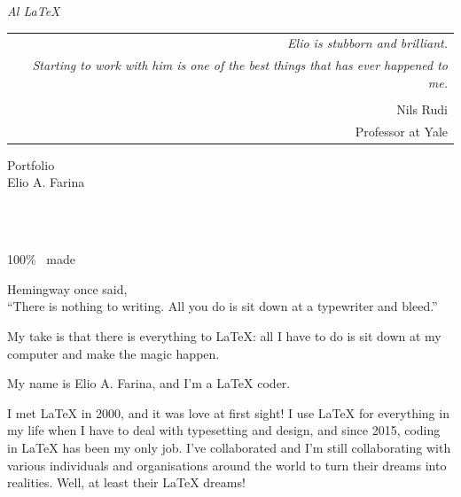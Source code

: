     \clearpage
    \begin{flushright}
        \textit{\huge Al \LaTeX}
    \end{flushright}
        \vfill
    \begin{center}
    \end{center}
        \vfill
    \strut\hfill\begin{tabular}{@{}r@{}}
        \Large\itshape Elio is stubborn and brilliant.\\
        \Large\itshape Starting to work with him is one of the best things that has ever happened to me.\\
        \strut\\
        \Large Nils Rudi\\
        \Large Professor at Yale
    \end{tabular}
        \vfill
    \begin{flushright}
        \huge
        Portfolio\\
        Elio A. Farina\\
        \LARGE
        \strut\\
        \strut\\
        100\% \LaTeXe\ made
    \end{flushright}
\clearpage
\begingroup\LARGE\raggedright\setlength{\parskip}{\baselineskip}
Hemingway once said,\\ ``There is nothing to writing. All you do is sit down at a typewriter and bleed.''

My take is that there is everything to \LaTeX{}: all I have to do is sit down at my computer and make the magic happen.

My name is Elio A. Farina, and I’m a \LaTeX{} coder.

I met \LaTeX{} in 2000, and it was love at first sight! I use \LaTeX{} for everything in my life when I have to deal with typesetting and design, and since 2015, coding in \LaTeX{} has been my only job. I’ve collaborated and I’m still collaborating with various individuals and organisations around the world to turn their dreams into realities. Well, at least their \LaTeX{} dreams!

